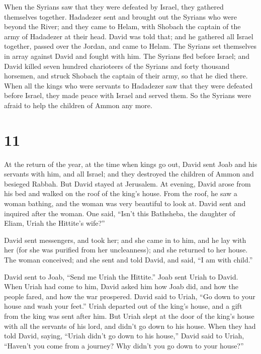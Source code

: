  When the Syrians saw that they were defeated by Israel,
they gathered themselves together.  Hadadezer sent and
brought out the Syrians who were beyond the River; and they came to
Helam, with Shobach the captain of the army of Hadadezer at their head.
 David was told that; and he gathered all Israel
together, passed over the Jordan, and came to Helam. The Syrians set
themselves in array against David and fought with him. 
The Syrians fled before Israel; and David killed seven hundred
charioteers of the Syrians and forty thousand horsemen, and struck
Shobach the captain of their army, so that he died there.
 When all the kings who were servants to Hadadezer saw
that they were defeated before Israel, they made peace with Israel and
served them. So the Syrians were afraid to help the children of Ammon
any more.

\hypertarget{section-10}{%
\section{11}\label{section-10}}

 At the return of the year, at the time when kings go out,
David sent Joab and his servants with him, and all Israel; and they
destroyed the children of Ammon and besieged Rabbah. But David stayed at
Jerusalem.  At evening, David arose from his bed and
walked on the roof of the king's house. From the roof, he saw a woman
bathing, and the woman was very beautiful to look at. 
David sent and inquired after the woman. One said, ``Isn't this
Bathsheba, the daughter of Eliam, Uriah the Hittite's wife?''

 David sent messengers, and took her; and she came in to
him, and he lay with her (for she was purified from her uncleanness);
and she returned to her house.  The woman conceived; and
she sent and told David, and said, ``I am with child.''

 David sent to Joab, ``Send me Uriah the Hittite.'' Joab
sent Uriah to David.  When Uriah had come to him, David
asked him how Joab did, and how the people fared, and how the war
prospered.  David said to Uriah, ``Go down to your house
and wash your feet.'' Uriah departed out of the king's house, and a gift
from the king was sent after him.  But Uriah slept at the
door of the king's house with all the servants of his lord, and didn't
go down to his house.  When they had told David, saying,
``Uriah didn't go down to his house,'' David said to Uriah, ``Haven't
you come from a journey? Why didn't you go down to your house?''

